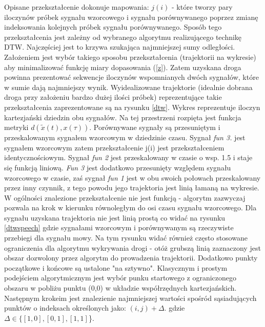 Opisane przekształcenie dokonuje mapowania: $j(i)$ - które tworzy pary iloczynów próbek sygnału wzorcowego i sygnału porównywanego poprzez zmianę indeksowania kolejnych próbek sygnału porównywanego. Sposób tego przekształcenia jest zależny od wybranego algorytmu realizującego technikę DTW. Najczęściej jest to krzywa szukająca najmniejszej sumy odległości. Założeniem jest wybór takiego sposobu przekształcenia (trajektorii na wykresie) aby minimalizować funkcję miary dopasowania (\ref{z}). Zatem
uzyskana droga powinna prezentować sekwencje iloczynów wspomnianych dwóch sygnałów, które w sumie dają najmniejszy wynik. Wyidealizowane trajektorie (idealnie dobrana droga przy założeniu bardzo dużej ilości próbek) reprezentujące takie przekształcenia zaprezentowane są na rysunku \ref{dtw}. Wykres reprezentuje iloczyn kartezjański dziedzin obu sygnałów. Na tej przestrzeni rozpięta jest funkcja metryki $d(\tilde{x}(t), x(\tau))$. Porównywane sygnały są przesuniętym i przeskalowanym sygnałem
wzorcowym w dziedzinie czasu. Sygnał \textit{fun 3.} jest sygnałem wzorcowym zatem przekształcenie j(i) jest przekształceniem identycznościowym. Sygnał \textit{fun 2} jest przeskalowany w czasie o wsp. 1.5 i staje się funkcją liniową. \textit{Fun 3} jest dodatkowo przesunięty względem sygnału wzorcowego w czasie, zaś sygnał \textit{fun 1} jest w obu swoich połowach przeskalowany przez inny czynnik, z tego powodu jego trajektoria jest linią łamaną na wykresie. W ogólności znalezione
przekształcenie nie jest funkcją - algorytm zazwyczaj pozwala na krok w kierunku równoległym do osi czasu sygnału wzorcowego. Dla sygnału uzyskana trajektoria nie jest linią prostą co widać na rysunku \ref{dtwspeech} gdzie sygnałami wzorcowym i porównywanym są rzeczywiste przebiegi dla sygnału mowy. Na tym rysunku widać również często stosowane ograniczenia dla algorytmu wykrywania drogi - otóż grubszą linią zaznaczony jest obszar dozwolony przez algorytm do prowadzenia trajektorii. Dodatkowo
punkty początkowe i końcowe są ustalone "na sztywno". Klasycznym i prostym podejściem algorytmicznym jest wybór punku startowego z ograniczonego obszaru w pobliżu punktu (0,0) w układzie współrzędnych kartezjańskich. Następnym krokeim jest znalezienie najmniejszej wartości spośród sąsiadujących punktów o indeksach określonych jako: $(i, j) + \Delta.$ gdzie $ \Delta \in \{ [1,0], [0, 1], [1, 1]$\}. 
